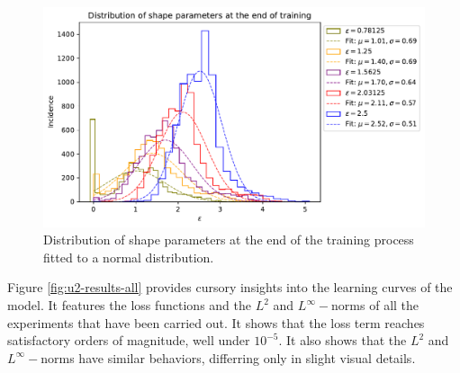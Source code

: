 \documentclass[12pt]{report} %
\begin{document}
\begin{figure}[h]
  \includegraphics[width=\textwidth]{imagenes/experiments/1d/statistical_1d_full_scheduler_interpolation/distribution_of_shape_parameters_at_end_of_training.pdf}
  \caption{Distribution of shape parameters at the end of the training process fitted to a normal distribution.}
  \label{fig:u2-results-shape-parameters}
\end{figure}

Figure \ref{fig:u2-results-all} provides cursory insights into the learning curves of the model. It features the loss functions and the $L^2$ and $L^\infty-$norms of all the experiments that have been carried out. It shows that the loss term reaches satisfactory orders of magnitude, well under $10^{-5}$. It also shows that the $L^2$ and $L^\infty-$norms have similar behaviors, differring only in slight visual details.
\end{document}
